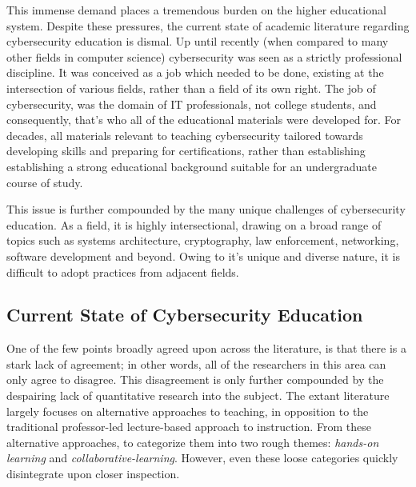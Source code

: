 \documentclass{article}
\begin{document}
    This immense demand places a tremendous burden on the higher educational system.
    Despite these pressures, the current state of academic literature regarding cybersecurity education is dismal. 
    Up until recently (when compared to many other fields in computer science) cybersecurity was seen as a strictly professional discipline. 
    It was conceived as a job which needed to be done, existing at the intersection of various fields, rather than a field of its own right.
    The job of cybersecurity, was the domain of IT professionals, not college students, and consequently, that's who all of the educational materials were developed for. 
    For decades, all materials relevant to teaching cybersecurity tailored towards developing skills and preparing for certifications, rather than establishing establishing a strong educational background suitable for an undergraduate course of study. 
    
    This issue is further compounded by the many unique challenges of cybersecurity education. 
    As a  field, it is highly intersectional, drawing on a broad range of topics such as systems architecture, cryptography, law enforcement, networking, software development and beyond. 
    Owing to it's unique and diverse nature, it is difficult to adopt practices from adjacent fields. 

    \subsection{Current State of Cybersecurity Education} %

    One of the few points broadly agreed upon across the literature, is that there is a stark lack of agreement; 
    in other words, all of the researchers in this area can only agree to disagree.
    This disagreement is only further compounded by the despairing lack of quantitative research into the subject. 
    The extant literature largely focuses on alternative approaches to teaching, in opposition to the traditional professor-led lecture-based approach to instruction.
    From these alternative approaches, to categorize them into two rough themes: \emph{hands-on learning} and \emph{collaborative-learning}. 
    However, even these loose categories quickly disintegrate upon closer inspection. 
\end{document}
